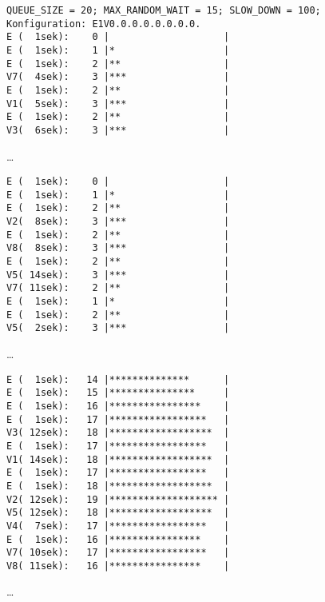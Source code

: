 \begin{ausgabe}[H]
\begin{scriptsize}
\begin{spacing}{1.0}
\begin{verbatim}
QUEUE_SIZE = 20; MAX_RANDOM_WAIT = 15; SLOW_DOWN = 100;
Konfiguration: E1V0.0.0.0.0.0.0.0.
E (  1sek):    0 |                    |
E (  1sek):    1 |*                   |
E (  1sek):    2 |**                  |
V7(  4sek):    3 |***                 |
E (  1sek):    2 |**                  |
V1(  5sek):    3 |***                 |
E (  1sek):    2 |**                  |
V3(  6sek):    3 |***                 |
\end{verbatim}

…

\begin{verbatim}
E (  1sek):    0 |                    |
E (  1sek):    1 |*                   |
E (  1sek):    2 |**                  |
V2(  8sek):    3 |***                 |
E (  1sek):    2 |**                  |
V8(  8sek):    3 |***                 |
E (  1sek):    2 |**                  |
V5( 14sek):    3 |***                 |
V7( 11sek):    2 |**                  |
E (  1sek):    1 |*                   |
E (  1sek):    2 |**                  |
V5(  2sek):    3 |***                 |
\end{verbatim}

…

\begin{verbatim}
E (  1sek):   14 |**************      |
E (  1sek):   15 |***************     |
E (  1sek):   16 |****************    |
E (  1sek):   17 |*****************   |
V3( 12sek):   18 |******************  |
E (  1sek):   17 |*****************   |
V1( 14sek):   18 |******************  |
E (  1sek):   17 |*****************   |
E (  1sek):   18 |******************  |
V2( 12sek):   19 |******************* |
V5( 12sek):   18 |******************  |
V4(  7sek):   17 |*****************   |
E (  1sek):   16 |****************    |
V7( 10sek):   17 |*****************   |
V8( 11sek):   16 |****************    |
\end{verbatim}

…


\end{spacing}
\end{scriptsize}
\end{ausgabe}

